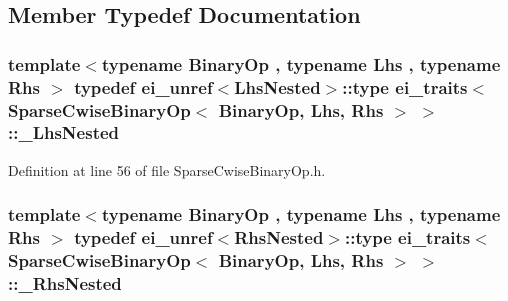 \subsection{Member Typedef Documentation}
\hypertarget{structei__traits_3_01_sparse_cwise_binary_op_3_01_binary_op_00_01_lhs_00_01_rhs_01_4_01_4_a61105d75febe137987825ec7270c1ef8}{
\subsubsection[{\-\_\-\-Lhs\-Nested}]{\setlength{\rightskip}{0pt plus 5cm}template$<$typename Binary\-Op , typename Lhs , typename Rhs $>$ typedef {\bf ei\-\_\-unref}$<${\bf Lhs\-Nested}$>$\-::{\bf type} {\bf ei\-\_\-traits}$<$ {\bf Sparse\-Cwise\-Binary\-Op}$<$ Binary\-Op, Lhs, Rhs $>$ $>$\-::{\bf \-\_\-\-Lhs\-Nested}}}\label{structei__traits_3_01_sparse_cwise_binary_op_3_01_binary_op_00_01_lhs_00_01_rhs_01_4_01_4_a61105d75febe137987825ec7270c1ef8}


Definition at line 56 of file Sparse\-Cwise\-Binary\-Op.\-h.

\hypertarget{structei__traits_3_01_sparse_cwise_binary_op_3_01_binary_op_00_01_lhs_00_01_rhs_01_4_01_4_ace44b60e0ccf392bbc089baa54b2eb80}{
\subsubsection[{\-\_\-\-Rhs\-Nested}]{\setlength{\rightskip}{0pt plus 5cm}template$<$typename Binary\-Op , typename Lhs , typename Rhs $>$ typedef {\bf ei\-\_\-unref}$<${\bf Rhs\-Nested}$>$\-::{\bf type} {\bf ei\-\_\-traits}$<$ {\bf Sparse\-Cwise\-Binary\-Op}$<$ Binary\-Op, Lhs, Rhs $>$ $>$\-::{\bf \-\_\-\-Rhs\-Nested}}}\label{structei__traits_3_01_sparse_cwise_binary_op_3_01_binary_op_00_01_lhs_00_01_rhs_01_4_01_4_ace44b60e0ccf392bbc089baa54b2eb80}



